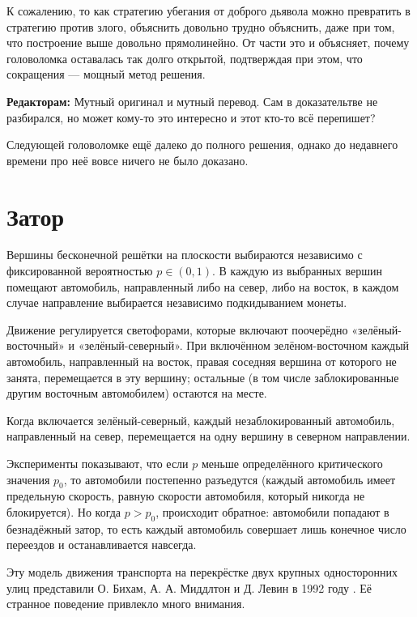 К сожалению, то как стратегию убегания от доброго дьявола можно превратить в стратегию против злого, объяснить довольно трудно объяснить, даже при том, что построение выше довольно прямолинейно.
От части это и объясняет, почему головоломка оставалась так долго открытой, подтверждая при этом, что сокращения --- мощный метод решения.

\begin{addedbytheeditors}
\textbf{Редакторам:} Мутный оригинал и мутный перевод. Сам в доказательтве не разбирался, но может кому-то это интересно и этот кто-то всё перепишет?
\end{addedbytheeditors}


\medskip

Следующей головоломке ещё далеко до полного решения,
однако до недавнего времени про неё вовсе ничего не было доказано.

\section*{Затор}

Вершины бесконечной решётки на плоскости выбираются независимо с
фиксированной вероятностью $p\in (0,1)$.
В каждую из выбранных вершин
помещают автомобиль, направленный либо на север, либо на восток, в
каждом случае направление выбирается независимо подкидыванием монеты.

Движение регулируется светофорами, которые включают поочерёдно
«зелёный-восточный» и «зелёный-северный».
При включённом
зелёном-восточном каждый автомобиль, направленный на восток, правая
соседняя вершина от которого не занята, перемещается в эту вершину;
остальные (в том числе заблокированные другим восточным автомобилем)
остаются на месте.

Когда включается зелёный-северный, каждый незаблокированный
автомобиль, направленный на север, перемещается на одну вершину в
северном направлении.

Эксперименты показывают, что если $p$ меньше определённого
критического значения $p_0$, то автомобили постепенно разъедутся
(каждый автомобиль имеет предельную скорость,
равную скорости автомобиля, который никогда не блокируется).
Но когда
$p> p_0$, происходит обратное: автомобили попадают в безнадёжный
затор, то есть каждый автомобиль совершает лишь конечное число переездов
и останавливается навсегда.

Эту модель движения транспорта на перекрёстке двух крупных односторонних улиц представили О. Бихам, А. А. Миддлтон и Д. Левин в 1992 году \cite{6}.
Её странное поведение привлекло много внимания.

